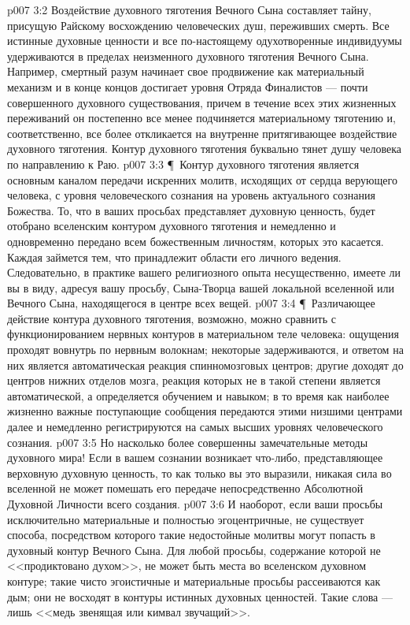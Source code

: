 \vs p007 3:2 Воздействие духовного тяготения Вечного Сына составляет тайну, присущую Райскому восхождению человеческих душ, переживших смерть. Все истинные духовные ценности и все по\hyp{}настоящему одухотворенные индивидуумы удерживаются в пределах неизменного духовного тяготения Вечного Сына. Например, смертный разум начинает свое продвижение как материальный механизм и в конце концов достигает уровня Отряда Финалистов --- почти совершенного духовного существования, причем в течение всех этих жизненных переживаний он постепенно все менее подчиняется материальному тяготению и, соответственно, все более откликается на внутренне притягивающее воздействие духовного тяготения. Контур духовного тяготения буквально тянет душу человека по направлению к Раю.
\vs p007 3:3 \P\ Контур духовного тяготения является основным каналом передачи искренних молитв, исходящих от сердца верующего человека, с уровня человеческого сознания на уровень актуального сознания Божества. То, что в ваших просьбах представляет духовную ценность, будет отобрано вселенским контуром духовного тяготения и немедленно и одновременно передано всем божественным личностям, которых это касается. Каждая займется тем, что принадлежит области его личного ведения. Следовательно, в практике вашего религиозного опыта несущественно, имеете ли вы в виду, адресуя вашу просьбу, Сына\hyp{}Творца вашей локальной вселенной или Вечного Сына, находящегося в центре всех вещей.
\vs p007 3:4 \P\ Различающее действие контура духовного тяготения, возможно, можно сравнить с функционированием нервных контуров в материальном теле человека: ощущения проходят вовнутрь по нервным волокнам; некоторые задерживаются, и ответом на них является автоматическая реакция спинномозговых центров; другие доходят до центров нижних отделов мозга, реакция которых не в такой степени является автоматической, а определяется обучением и навыком; в то время как наиболее жизненно важные поступающие сообщения передаются этими низшими центрами далее и немедленно регистрируются на самых высших уровнях человеческого сознания.
\vs p007 3:5 Но насколько более совершенны замечательные методы духовного мира! Если в вашем сознании возникает что\hyp{}либо, представляющее верховную духовную ценность, то как только вы это выразили, никакая сила во вселенной не может помешать его передаче непосредственно Абсолютной Духовной Личности всего создания.
\vs p007 3:6 И наоборот, если ваши просьбы исключительно материальные и полностью эгоцентричные, не существует способа, посредством которого такие недостойные молитвы могут попасть в духовный контур Вечного Сына. Для любой просьбы, содержание которой не <<продиктовано духом>>, не может быть места во вселенском духовном контуре; такие чисто эгоистичные и материальные просьбы рассеиваются как дым; они не восходят в контуры истинных духовных ценностей. Такие слова --- лишь <<медь звенящая или кимвал звучащий>>.
